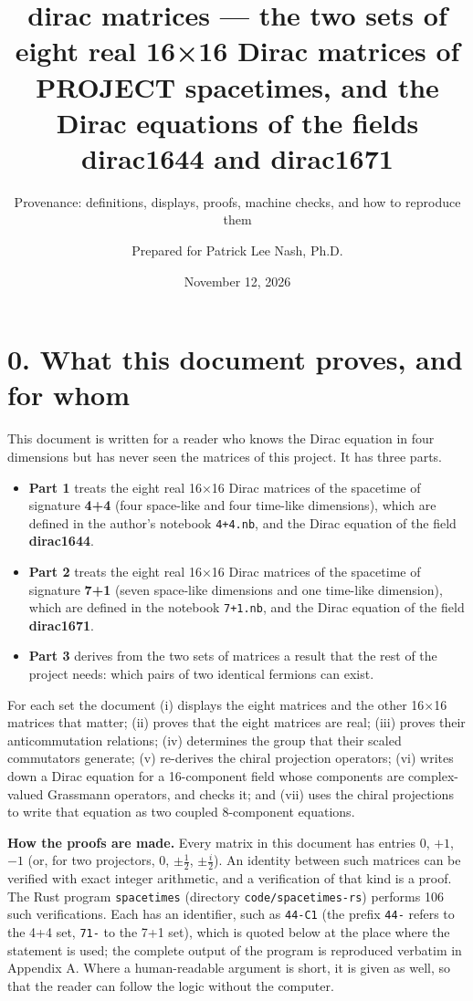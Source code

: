 \documentclass[
  10pt,
]{article}
\title{dirac matrices --- the two sets of eight real 16×16 Dirac
matrices of PROJECT spacetimes, and the Dirac equations of the fields
dirac1644 and dirac1671}
\subtitle{Provenance: definitions, displays, proofs, machine checks, and
how to reproduce them}
\author{Prepared for Patrick Lee Nash, Ph.D.}
\date{November 12, 2026}
\providecommand{\tightlist}{%
  \setlength{\itemsep}{0pt}\setlength{\parskip}{0pt}}
\begin{document}
\maketitle

\hypertarget{what-this-document-proves-and-for-whom}{%
\section{0. What this document proves, and for
whom}\label{what-this-document-proves-and-for-whom}}

This document is written for a reader who knows the Dirac equation in
four dimensions but has never seen the matrices of this project. It has
three parts.

\begin{itemize}
\tightlist
\item
  \textbf{Part 1} treats the eight real 16×16 Dirac matrices of the
  spacetime of signature \textbf{4+4} (four space-like and four
  time-like dimensions), which are defined in the author's notebook
  \texttt{4+4.nb}, and the Dirac equation of the field
  \textbf{dirac1644}.
\item
  \textbf{Part 2} treats the eight real 16×16 Dirac matrices of the
  spacetime of signature \textbf{7+1} (seven space-like dimensions and
  one time-like dimension), which are defined in the notebook
  \texttt{7+1.nb}, and the Dirac equation of the field
  \textbf{dirac1671}.
\item
  \textbf{Part 3} derives from the two sets of matrices a result that
  the rest of the project needs: which pairs of two identical fermions
  can exist.
\end{itemize}

For each set the document (i) displays the eight matrices and the other
16×16 matrices that matter; (ii) proves that the eight matrices are
real; (iii) proves their anticommutation relations; (iv) determines the
group that their scaled commutators generate; (v) re-derives the chiral
projection operators; (vi) writes down a Dirac equation for a
16-component field whose components are complex-valued Grassmann
operators, and checks it; and (vii) uses the chiral projections to write
that equation as two coupled 8-component equations.

\textbf{How the proofs are made.} Every matrix in this document has
entries \(0\), \(+1\), \(-1\) (or, for two projectors, \(0\),
\(\pm\tfrac12\), \(\pm\tfrac i2\)). An identity between such matrices
can be verified with exact integer arithmetic, and a verification of
that kind is a proof. The Rust program \texttt{spacetimes} (directory
\texttt{code/spacetimes-rs}) performs 106 such verifications. Each has
an identifier, such as \texttt{44-C1} (the prefix \texttt{44-} refers to
the 4+4 set, \texttt{71-} to the 7+1 set), which is quoted below at the
place where the statement is used; the complete output of the program is
reproduced verbatim in Appendix A. Where a human-readable argument is
short, it is given as well, so that the reader can follow the logic
without the computer.
\end{document}
